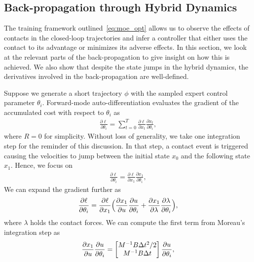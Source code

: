 \subsection{Back-propagation through Hybrid Dynamics}
\label{ssec:backprop_hybrid}

The training framework outlined~\eqref{eq:moe_opt} allows us to observe the
effects of contacts in the closed-loop trajectories and infer a controller that
either uses the contact to its advantage or minimizes its adverse effects.
%
In this section, we look at the relevant parts of the back-propagation to give
insight on how this is achieved.
%
We also show that despite the state jumps in the hybrid dynamics, the
derivatives involved in the back-propagation are well-defined.

Suppose we generate a short trajectory $\phi$ with the sampled expert control
parameter $\theta_i$.
%
Forward-mode auto-differentiation evaluates the gradient of the accumulated cost
with respect to $\theta_i$ as 
\begin{align*}
    \frac{\partial \ell}{\partial \theta_i} = \sum_{t=0}^{T} \frac{\partial \ell}{\partial x_t} \frac{\partial x_t}{\partial \theta_i} ,
\end{align*}
\noindent where $R=0$ for simplicity.
%
Without loss of generality, we take one integration step for the reminder of
this discussion. 
%
In that step, a contact event is triggered causing the velocities to jump
between the initial state $x_0$ and the following state $x_1$. 
%
Hence, we focus on 
\begin{align*}
    \frac{\partial \ell}{\partial \theta_i} = \frac{\partial \ell}{\partial x_1} \frac{\partial x_1}{\partial \theta_i},
\end{align*}
%
We can expand the gradient further as 
\begin{align*}
    \frac{\partial \ell}{\partial \theta_i} = \frac{\partial \ell}{\partial x_1} \Bigl( \frac{\partial x_1}{\partial u} \frac{\partial u}{\partial \theta_i} + \frac{\partial x_1}{\partial \lambda}\frac{\partial \lambda}{\partial \theta_i}\Bigr),
\end{align*}
\noindent where $\lambda$ holds the contact forces.
%
We can compute the first term from Moreau's integration step as
\begin{align*}
    \frac{\partial x_1}{\partial u} \frac{\partial u}{\partial \theta_i} = 
    \begin{bmatrix}M^{-1}B \Delta t^2/2 \\ M^{-1}B \Delta t\end{bmatrix} \frac{\partial u}{\partial \theta_i},
\end{align*} 
